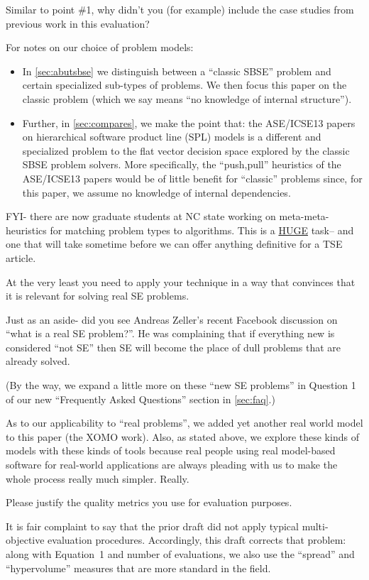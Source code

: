 \documentclass[10pt,journal,compsoc]{IEEEtran}
\newcommand{\bi}{\begin{itemize}}
\newcommand{\ei}{\end{itemize}}
\newcommand{\tion}[1]{\textsection\ref{sec:#1}}
\newenvironment{changed}{\par}{\par}
\begin{document}
Similar to point \#1, why didn't you (for
example) include the case studies from previous work
in this evaluation?  
\begin{changed}
For notes on our choice of problem models:
\bi
\item
In \tion{abutsbse} we distinguish between a  ``classic SBSE'' problem
and certain specialized sub-types of problems. 
We then focus this paper on the classic problem (which we say means
``no knowledge of internal structure'').
\item
Further, 
in
\tion{compares}, we make the point that:
the ASE/ICSE13
papers on hierarchical software product line (SPL)
models is a different and specialized problem to the flat vector
decision space explored by the classic SBSE  problem solvers.
More specifically, 
the ``push,pull'' heuristics of the
ASE/ICSE13 papers would be of little benefit for ``classic'' problems
since, for this paper, we assume
no knowledge of internal dependencies.
\ei
FYI- there are now graduate students at NC state
working on meta-meta-heuristics for matching problem
types to algorithms. This is a \underline{HUGE}
task-- and one that will take sometime
before we can offer anything definitive for a TSE
article.  
\end{changed}
At the very least you need to
apply your technique in a way that convinces that it
is relevant for solving real SE problems.
\begin{changed}
Just as an aside- did you see Andreas Zeller's recent Facebook
discussion on ``what is a real SE problem?''. He was complaining that
if everything new is considered ``not SE'' then SE will become the
place of dull problems that are already solved.

(By the way, we expand a little more on these ``new SE problems'' in Question 1
of our new ``Frequently Asked Questions'' section in \tion{faq}.)

As to our applicability to ``real problems'',
we added yet another real world model to this paper (the XOMO work).
Also, as stated above, we explore these kinds of models
with these kinds of tools because
real people using real model-based software for real-world
applications are always pleading with us to make the whole
process really much simpler. Really.


\end{changed}


Please justify the quality metrics you use for evaluation purposes.

\begin{changed}
It is fair complaint to say that the prior draft did not apply
typical multi-objective evaluation procedures.   Accordingly, this draft corrects that problem: along with Equation~1
and number of evaluations, we also use the ``spread'' and ``hypervolume'' measures that are more standard
in the field.





\end{changed}
\end{document}
